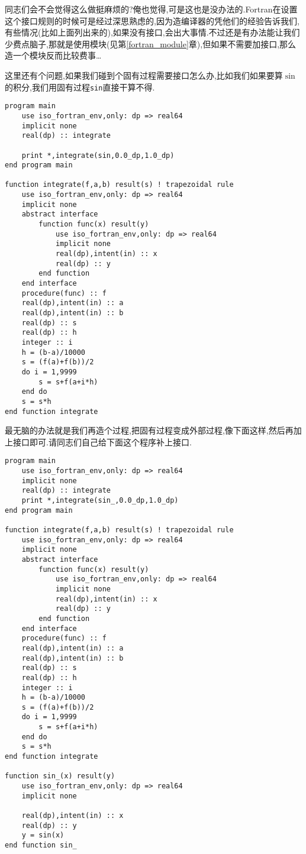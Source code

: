 同志们会不会觉得这么做挺麻烦的?俺也觉得,可是这也是没办法的.Fortran在设置这个接口规则的时候可是经过深思熟虑的,因为造编译器的凭他们的经验告诉我们,有些情况(比如上面列出来的),如果没有接口,会出大事情.不过还是有办法能让我们少费点脑子,那就是使用模块(见第\ref{fortran_module}章),但如果不需要加接口,那么造一个模块反而比较费事\dots

这里还有个问题,如果我们碰到个固有过程需要接口怎么办,比如我们如果要算$\sin$的积分,我们用固有过程\texttt{sin}直接干算不得.
\begin{lstlisting}
program main
    use iso_fortran_env,only: dp => real64
    implicit none
    real(dp) :: integrate

    print *,integrate(sin,0.0_dp,1.0_dp)
end program main

function integrate(f,a,b) result(s) ! trapezoidal rule
    use iso_fortran_env,only: dp => real64
    implicit none
    abstract interface
        function func(x) result(y)
            use iso_fortran_env,only: dp => real64
            implicit none
            real(dp),intent(in) :: x
            real(dp) :: y
        end function
    end interface
    procedure(func) :: f
    real(dp),intent(in) :: a
    real(dp),intent(in) :: b
    real(dp) :: s
    real(dp) :: h
    integer :: i
    h = (b-a)/10000
    s = (f(a)+f(b))/2
    do i = 1,9999
        s = s+f(a+i*h)
    end do
    s = s*h
end function integrate
\end{lstlisting}
最无脑的办法就是我们再造个过程,把固有过程变成外部过程,像下面这样,然后再加上接口即可.请同志们自己给下面这个程序补上接口.
\begin{lstlisting}
program main
    use iso_fortran_env,only: dp => real64
    implicit none
    real(dp) :: integrate
    print *,integrate(sin_,0.0_dp,1.0_dp)
end program main

function integrate(f,a,b) result(s) ! trapezoidal rule
    use iso_fortran_env,only: dp => real64
    implicit none
    abstract interface
        function func(x) result(y)
            use iso_fortran_env,only: dp => real64
            implicit none
            real(dp),intent(in) :: x
            real(dp) :: y
        end function
    end interface
    procedure(func) :: f
    real(dp),intent(in) :: a
    real(dp),intent(in) :: b
    real(dp) :: s
    real(dp) :: h
    integer :: i
    h = (b-a)/10000
    s = (f(a)+f(b))/2
    do i = 1,9999
        s = s+f(a+i*h)
    end do
    s = s*h
end function integrate

function sin_(x) result(y)
    use iso_fortran_env,only: dp => real64
    implicit none

    real(dp),intent(in) :: x
    real(dp) :: y
    y = sin(x)
end function sin_
\end{lstlisting}


